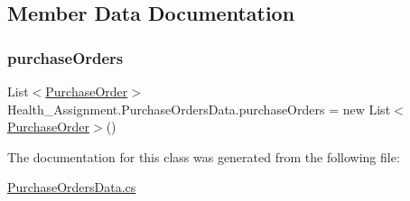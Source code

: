 \subsection{Member Data Documentation}
\mbox{\label{class_health___assignment_1_1_purchase_orders_data_aba43968c7505ff3c3eb0f58b337465f1}} 
\subsubsection{\texorpdfstring{purchase\+Orders}{purchaseOrders}}
{\footnotesize\ttfamily List$<$\hyperlink{class_health___assignment_1_1_purchase_order}{Purchase\+Order}$>$ Health\+\_\+\+Assignment.\+Purchase\+Orders\+Data.\+purchase\+Orders = new List$<$\hyperlink{class_health___assignment_1_1_purchase_order}{Purchase\+Order}$>$()\hspace{0.3cm}{\ttfamily [static]}}



The documentation for this class was generated from the following file\+:\begin{DoxyCompactItemize}
\item 
\hyperlink{_purchase_orders_data_8cs}{Purchase\+Orders\+Data.\+cs}\end{DoxyCompactItemize}
